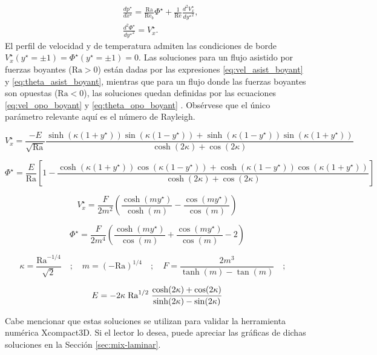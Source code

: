 \begin{align}
&\frac{d \text{p}^{\star} }{d x^{\star}} = \frac{\text{Ra}}{\text{Re}_b } \Phi^{\star} + \frac{1}{\text{Re}} \frac{d^2 V^{\star}_x}{d {y^{\star}}^2}, \\
&\frac{d^2 \Phi^{\star}}{ d {y^{\star}}^2 } =  V^{\star}_x \text{.}
\label{eq:base1}
\end{align}
El perfil de velocidad y de temperatura admiten las condiciones de borde \linebreak  $V^{\star}_x({y^{\star}}= \pm 1) = \Phi^{\star} ({y^{\star}}= \pm 1) = 0 $. Las soluciones para un flujo asistido por fuerzas \linebreak  boyantes ($\text{Ra}>0$) están dadas por las expresiones \ref{eq:vel_asist_boyant} y \ref{eq:theta_asist_boyant}, mientras que para un flujo donde las fuerzas boyantes son opuestas ($\text{Ra}<0$), las soluciones quedan definidas por las ecuaciones \ref{eq:vel_opo_boyant} y \ref{eq:theta_opo_boyant} \cite{chen1996linear}. Obsérvese que el único parámetro relevante aquí es el número de Rayleigh.
\small{
\begin{equation}
V^{\star}_x = \frac{-E}{\sqrt{\text{Ra}}} \frac{\sinh(\kappa(1+y^{\star}))\sin(\kappa(1-y^{\star})) + \sinh(\kappa(1-y^{\star}))\sin(\kappa(1+y^{\star})) }{\cosh(2\kappa) + \cos(2\kappa)}
\label{eq:vel_asist_boyant}
\end{equation}

\begin{equation}
\Phi^{\star} = \frac{E}{\text{Ra}} \left[ 1 - \frac{\cosh(\kappa(1+y^{\star}))\cos(\kappa(1-y^{\star})) + \cosh(\kappa(1-y^{\star}))\cos(\kappa(1+y^{\star}))}{\cosh(2\kappa) + \cos(2\kappa)} \right] 
\label{eq:theta_asist_boyant}
\end{equation}

\begin{equation}
V^{\star}_x = \frac{F}{2 m^2} \left( \frac{\cosh(m y^{\star})}{\cosh(m)} - \frac{\cos(m y^{\star})}{\cos(m)} \right) 
\label{eq:vel_opo_boyant}
\end{equation}

\begin{equation}
\Phi^{\star} = \frac{F}{2 m^4} \left( \frac{\cosh(m y^{\star})}{\cos(m)} + \frac{\cos(m y^{\star})}{\cos(m)} - 2 \right) 
\label{eq:theta_opo_boyant}
\end{equation}

\begin{equation*}
\kappa = \frac{\text{Ra}^{-1/4}}{\sqrt{2}} \quad ; \quad m = (-\text{Ra})^{1/4} \quad ; \quad F = \frac{2 m^3}{\tanh(m)-\tan(m)} \quad ; \quad
\end{equation*}

\begin{equation*}
E= -2 \kappa \hspace{1mm} \text{Ra}^{1/2} \hspace{1mm} \frac{\cosh(2\kappa) + \cos(2\kappa)}{\sinh(2\kappa) - \sin(2\kappa)} 
\end{equation*}
}
Cabe mencionar que estas soluciones se utilizan para validar la herramienta numérica \linebreak Xcompact3D. Si el lector lo desea, puede apreciar las gráficas de dichas soluciones en la Sección \ref{sec:mix-laminar}.  


